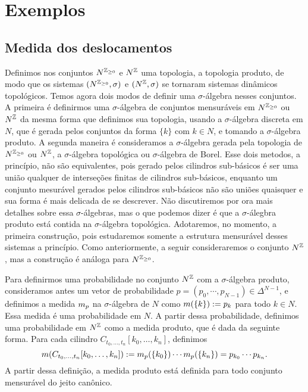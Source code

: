 










\section{Exemplos}

\subsection{Medida dos deslocamentos}

Definimos nos conjuntos $N^{\mathbb{Z}_{\geq 0}}$ e $N^{\mathbb{Z}}$ uma topologia, a topologia produto, de modo que os sistemas $(N^{\mathbb{Z}_{\geq 0}},\sigma)$ e $(N^{\mathbb{Z}},\sigma)$ se tornaram sistemas dinâmicos topológicos. Temos agora dois modos de definir uma $\sigma$-álgebra nesses conjuntos. A primeira é definirmos uma $\sigma$-álgebra de conjuntos mensuráveis em $N^{\mathbb{Z}_{\geq 0}}$ ou $N^{\mathbb{Z}}$ da mesma forma que definimos sua topologia, usando a $\sigma$-álgebra discreta em $N$, que é gerada pelos conjuntos da forma $\{k\}$ com $k \in N$, e tomando a $\sigma$-álgebra produto. A segunda maneira é consideramos a $\sigma$-álgebra gerada pela topologia de $N^{\mathbb{Z}_{\geq 0}}$ ou $N^{\mathbb{Z}}$, a $\sigma$-álgebra topológica ou $\sigma$-álgebra de Borel. Esse dois metodos, a princípio, não são equivalentes, pois gerado pelos cilindros sub-básicos é ser uma união qualquer de interseções finitas de cilindros sub-básicos, enquanto um conjunto mesurável gerados pelos cilindros sub-básicos não são uniões quaisquer e sua forma é mais delicada de se descrever. Não discutiremos por ora mais detalhes sobre essa $\sigma$-álgebras, mas o que podemos dizer é que a $\sigma$-álegbra produto está contida na $\sigma$-álgebra topológica. Adotaremos, no momento, a primeira construção, pois estudaremos somente a estrutura mensurável desses sistemas a princípio. Como anteriormente, a seguir consideraremos o conjunto $N^{\mathbb{Z}}$, mas a construção é análoga para $N^{\mathbb{Z}_{\geq 0}}$.

Para definirmos uma probabilidade no conjunto $N^{\mathbb{Z}}$ com a $\sigma$-álgebra produto, consideramos antes um vetor de probabilidade $p=(p_0,\cdots,p_{N-1}) \in \Delta^{N-1}$, e definimos a medida $m_p$ na $\sigma$-álgebra de $N$ como $m(\{k\}) := p_k$ para todo $k \in N$. Essa medida é uma probabilidade em $N$. A partir dessa probabilidade, definimos uma probabilidade em $N^{\mathbb{Z}}$ como a medida produto, que é dada da seguinte forma. Para cada cilindro $C_{t_0,\ldots,t_n}[k_0,\ldots,k_n]$, definimos
	\begin{equation*}
	m(C_{t_0,\ldots,t_n}[k_0,\ldots,k_n]) := m_p(\{k_0\}) \cdots m_p(\{k_n\}) = p_{k_0} \cdots p_{k_n}.
	\end{equation*}
A partir dessa definição, a medida produto está definida para todo conjunto mensurável do jeito canônico.

